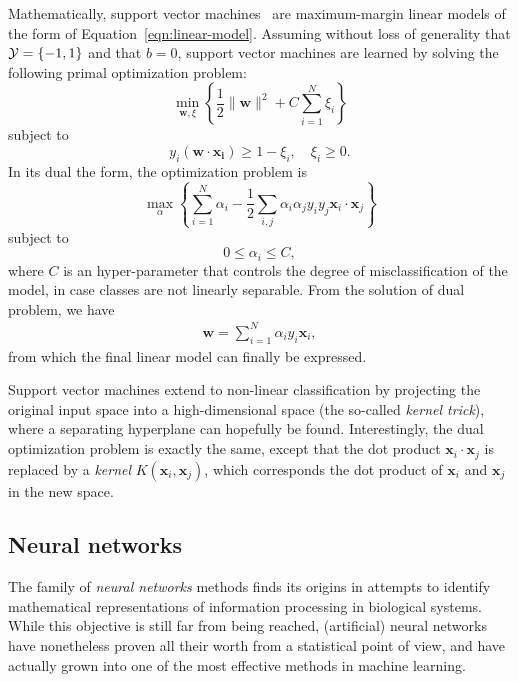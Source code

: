Mathematically, support vector machines~\citep{boser:1992,cortes:1995} are
maximum-margin linear models of the form of Equation~\ref{eqn:linear-model}.
Assuming without loss of generality that ${\cal Y}=\{-1,1\}$ and that $b=0$,
support vector machines are learned by solving the following primal
optimization problem:
\begin{equation}
\min_{\mathbf{w},\xi } \left\{\frac{1}{2} \|\mathbf{w}\|^2 + C \sum_{i=1}^N \xi_i \right\}
\end{equation}
subject to
\begin{equation}
y_i(\mathbf{w}\cdot\mathbf{x_i}) \ge 1 - \xi_i, \quad \xi_i \ge 0.
\end{equation}
In its dual the form, the optimization problem is
\begin{equation}
\max_{\alpha} \left\{ \sum_{i=1}^N \alpha_i - \frac{1}{2}\sum_{i, j} \alpha_i \alpha_j y_i y_j \mathbf{x}_i\cdot\mathbf{x}_j \right\}
\end{equation}
subject to
\begin{equation}
0 \leq \alpha_i \leq C,
\end{equation}
where $C$ is an hyper-parameter that controls
the degree of misclassification of the model, in case classes are not linearly
separable. From the solution of dual problem, we have
\begin{align}
\textbf{w} = \sum_{i=1}^N \alpha_i y_i \mathbf{x}_i,
\end{align}
from which the final linear model can finally be expressed.

Support vector machines extend to non-linear classification by projecting the
original input space into a high-dimensional space (the so-called
\textit{kernel trick}), where a separating hyperplane can hopefully be found.
Interestingly, the dual optimization problem is exactly the same, except that the dot product
$\mathbf{x}_i\cdot\mathbf{x}_j$ is replaced by a \textit{kernel}
$K(\mathbf{x}_i, \mathbf{x}_j)$\label{ntn:kernel}, which corresponds the dot product of
$\mathbf{x}_i$ and $\mathbf{x}_j$ in the new space.


\subsection{Neural networks}

The family of \textit{neural networks} methods finds its origins in attempts to
identify mathematical representations of information processing in biological
systems. While this objective is still far from being reached, (artificial)
neural networks have nonetheless proven all their worth from a statistical point of
view, and have actually grown into one of the most effective methods in machine
learning.

